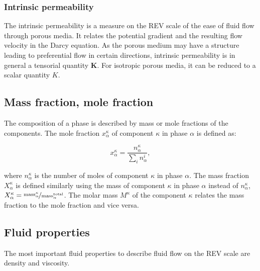 \subsubsection{Intrinsic permeability} 
The intrinsic permeability is a measure on the REV scale of the ease of fluid flow through porous media. 
It relates the potential gradient and the resulting flow velocity in the Darcy equation. 
As the porous medium may have a structure leading to preferential flow in certain directions, 
intrinsic permeability is in general a tensorial quantity $\mathbf{K}$. 
For isotropic porous media, it can be reduced to a scalar quantity $K$.


\newpage
\subsection[Mass fraction, mole fraction]{Mass fraction, mole fraction}\label{sec:mole_frac_molality}
The composition of a phase is described by mass or mole fractions of the components. 
The mole fraction $x^\kappa_\alpha$ of component $\kappa$ in phase $\alpha$ is defined as:

\begin{equation}\label{eq:def_molefrac}
x^\kappa_\alpha = \frac{n^\kappa_\alpha}{\sum_i n^i_\alpha},
\end{equation}

where $n^\kappa_\alpha$ is the number of moles of component $\kappa$ in phase $\alpha$. 
The mass fraction $X^\kappa_\alpha$ is defined similarly 
using the mass of component $\kappa$ in phase $\alpha$ instead of $n^\kappa_\alpha$,
$X^\kappa_\alpha = \nicefrac{\mathrm{mass^\kappa_\alpha}}{\mathrm{mass^{total}_\alpha}}$.
% 
% 
The molar mass $M^\kappa$ of the component $\kappa$ relates the mass fraction 
to the mole fraction and vice versa.

\subsection[Fluid properties]{Fluid properties}\label{sec:fluid_properties}
The most important fluid properties to describe fluid flow on the REV scale are density and viscosity.


